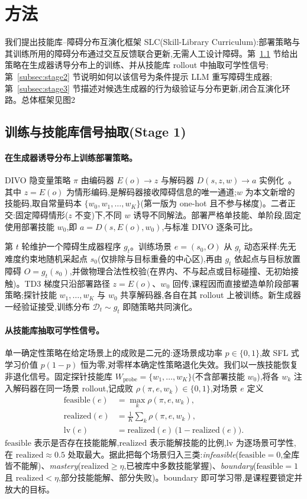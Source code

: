 \documentclass[11pt,a4paper,fontset=noto]{ctexart}
\newcommand{\feasible}{\mathrm{feasible}}
\newcommand{\realized}{\mathrm{realized}}
\newcommand{\lv}{\mathrm{lv}}
\newcommand{\Wprobe}{W_{\mathrm{probe}}}
\begin{document}
\section{方法}
\label{sec:method}

我们提出技能库--障碍分布互演化框架 SLC(Skill-Library Curriculum):部署策略与其训练所用的障碍分布通过交互反馈联合更新,无需人工设计障碍。第~\ref{subsec:stage1} 节给出策略在生成器诱导分布上的训练、并从技能库 rollout 中抽取可学性信号;第~\ref{subsec:stage2} 节说明如何以该信号为条件提示 LLM 重写障碍生成器;第~\ref{subsec:stage3} 节描述对候选生成器的行为级验证与分布更新,闭合互演化环路。总体框架见图2\。

\subsection{训练与技能库信号抽取(Stage 1)}
\label{subsec:stage1}

\paragraph{在生成器诱导分布上训练部署策略。}
DIVO 隐变量策略 $\pi$ 由编码器 $E(o)\!\to\! z$ 与解码器 $D(s,z,w)\!\to\! a$ 实例化~\citep{divo}。其中 $z=E(o)$ 为情形编码,是解码器接收障碍信息的唯一通道;$w$ 为本文新增的技能码,取自常量码本 $\{w_0,w_1,\dots,w_K\}$(第一版为 one-hot 且不参与梯度)。二者正交:固定障碍情形($z$ 不变)下,不同 $w$ 诱导不同解法。部署严格单技能、单阶段,固定使用部署技能 $w_0$,即 $a=D(s,E(o),w_0)$,与标准 DIVO 逐条可比。

第 $t$ 轮维护一个障碍生成器程序 $g_t$。训练场景 $e=(s_0,O)$ 从 $g_t$ 动态采样:先无难度约束地随机采起点 $s_0$(仅排除与目标重叠的中心区),再由 $g_t$ 依起点与目标放置障碍 $O=g_t(s_0)$,并做物理合法性校验(在界内、不与起点或目标碰撞、无初始接触)。TD3 梯度只沿部署路径 $z=E(o)$、$w_0$ 回传,课程因而直接塑造单阶段部署策略;探针技能 $w_1,\dots,w_K$ 与 $w_0$ 共享解码器,各自在其 rollout 上被训练。新生成器一经验证接受,训练分布 $\mathcal{D}_t\sim g_t$ 即随策略共同演化。

\paragraph{从技能库抽取可学性信号。}
单一确定性策略在给定场景上的成败是二元的:逐场景成功率 $p\in\{0,1\}$,故 SFL 式学习价值 $p(1-p)$ 恒为零,对零样本确定性策略退化失效。我们以一族技能恢复非退化信号。固定探针技能库 $\Wprobe=\{w_1,\dots,w_K\}$(不含部署技能 $w_0$),将各 $w_k$ 注入解码器在同一场景 rollout,记成败 $\rho(\pi,e,w_k)\in\{0,1\}$,对场景 $e$ 定义
\begin{align}
\feasible(e) &= \max_k \rho(\pi,e,w_k), \label{eq:feasible}\\
\realized(e) &= \frac{1}{K}\sum_{k} \rho(\pi,e,w_k), \label{eq:realized}\\
\lv(e) &= \realized(e)\,\bigl(1-\realized(e)\bigr). \label{eq:lv}
\end{align}
$\feasible$ 表示是否存在技能能解,$\realized$ 表示能解技能的比例,$\lv$ 为逐场景可学性,在 $\realized\!\approx\!0.5$ 处取最大。据此把每个场景归入三类:\emph{infeasible}($\feasible=0$,全库皆不能解)、\emph{mastery}($\realized\ge\eta$,已被库中多数技能掌握)、\emph{boundary}($\feasible=1$ 且 $\realized<\eta$,部分技能能解、部分失败)。boundary 即可学习带,是课程要锁定并放大的目标。
\end{document}
